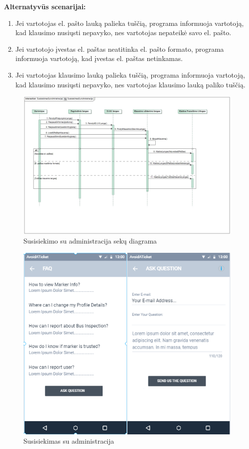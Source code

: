 \documentclass{VUMIFPSkursinis}
\begin{document}
	\textbf{Alternatyvūs scenarijai:}
	\begin{enumerate}[itemsep=-2mm]
		\item Jei vartotojas el. pašto lauką palieka tuščią, programa informuoja vartotoją, kad klausimo nusiųsti nepavyko, nes vartotojas nepateikė savo el. pašto.
		\item Jei vartotojo įvestas el. paštas neatitinka el. pašto formato, programa informuoja vartotoją, kad įvestas el. paštas netinkamas.
		\item Jei vartotojas klausimo lauką palieka tuščią, programa informuoja vartotoją, kad klausimo nusiųsti nepavyko, nes vartotojas klausimo lauką paliko tuščią.
	\end{enumerate} 
		\begin{figure}[H]
				\centering
				\includegraphics[scale=0.4]{img/ContactAdminSequence}
				\caption{Susisiekimo su administracija sekų diagrama}
				\label{img:Susisiekimas su administracija RD}
			\end{figure}
	\begin{figure}[H]
				\centering
				\includegraphics[scale=1.4]{img/mockup_admincomunication}
				\caption{Susisiekimas su administracija}
				\label{img:Susisiekimas su administracija}
			\end{figure}
\end{document}
